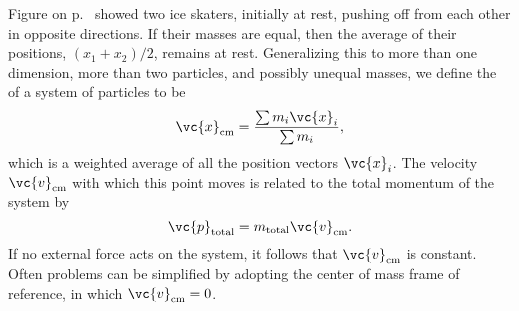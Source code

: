 Figure  on p.~\pageref{fig:skaters} showed two ice skaters,
initially at rest, pushing off from each other in opposite directions. If
their masses are equal, then the average of their positions, $(x_1+x_2)/2$,
remains at rest. Generalizing this to more than one dimension, more than two
particles, and possibly unequal masses, we define the  of
a system of particles to be
\begin{equation}
  \vc{x}_\text{cm} = \frac{\sum m_i \vc{x}_i}{\sum m_i},
\end{equation}
which is a weighted average of all the position vectors $\vc{x}_i$. The velocity $\vc{v}_\text{cm}$
with which this point moves is related to the
total momentum of the system by
\begin{equation}
  \vc{p}_\text{total} = m_\text{total}\vc{v}_\text{cm}.
\end{equation}
If no external force acts on the system, it follows that $\vc{v}_\text{cm}$ is constant.
Often problems can be simplified
by adopting the center of mass frame of reference,
in which $\vc{v}_\text{cm}=0$.
